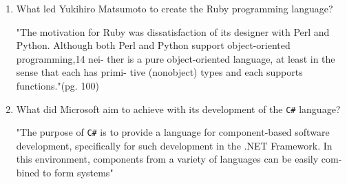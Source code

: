 \begin{enumerate}
  \item What led Yukihiro Matsumoto to create the Ruby programming language?

  \begin{answer}

    "The motivation for Ruby was dissatisfaction of its designer with
    Perl and Python. Although both Perl and Python support
    object-oriented programming,14 nei- ther is a pure object-oriented
    language, at least in the sense that each has primi- tive
    (nonobject) types and each supports functions."(pg. 100)

    \end{answer}

  \item What did Microsoft aim to achieve with its development of the
    \verb+C#+ language?

  \begin{answer}

   "The purpose of \verb+C#+ is to provide a language for component-based
    software development, specifically for such development in the
    .NET Framework. In this environment, components from a variety of
    languages can be easily com- bined to form systems"

    \end{answer}

  \end{enumerate}


